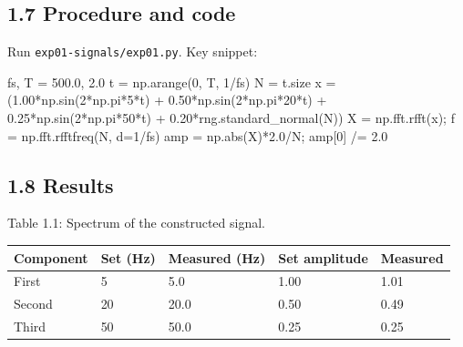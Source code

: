 \documentclass[
]{article}
\newenvironment{Shaded}{}{}
\newcommand{\BuiltInTok}[1]{\textcolor[rgb]{0.00,0.50,0.00}{#1}}
\newcommand{\DecValTok}[1]{\textcolor[rgb]{0.25,0.63,0.44}{#1}}
\newcommand{\FloatTok}[1]{\textcolor[rgb]{0.25,0.63,0.44}{#1}}
\newcommand{\NormalTok}[1]{#1}
\newcommand{\OperatorTok}[1]{\textcolor[rgb]{0.40,0.40,0.40}{#1}}
\newcounter{none} %
\begin{document}
\subsection{1.7 Procedure and code}\label{procedure-and-code}

Run \texttt{exp01-signals/exp01.py}. Key snippet:

\begin{Shaded}
\begin{Highlighting}[]
\NormalTok{fs, T }\OperatorTok{=} \FloatTok{500.0}\NormalTok{, }\FloatTok{2.0}
\NormalTok{t }\OperatorTok{=}\NormalTok{ np.arange(}\DecValTok{0}\NormalTok{, T, }\DecValTok{1}\OperatorTok{/}\NormalTok{fs)}
\NormalTok{N }\OperatorTok{=}\NormalTok{ t.size}
\NormalTok{x }\OperatorTok{=}\NormalTok{ (}\FloatTok{1.00}\OperatorTok{*}\NormalTok{np.sin(}\DecValTok{2}\OperatorTok{*}\NormalTok{np.pi}\OperatorTok{*}\DecValTok{5}\OperatorTok{*}\NormalTok{t) }\OperatorTok{+} \FloatTok{0.50}\OperatorTok{*}\NormalTok{np.sin(}\DecValTok{2}\OperatorTok{*}\NormalTok{np.pi}\OperatorTok{*}\DecValTok{20}\OperatorTok{*}\NormalTok{t)}
     \OperatorTok{+} \FloatTok{0.25}\OperatorTok{*}\NormalTok{np.sin(}\DecValTok{2}\OperatorTok{*}\NormalTok{np.pi}\OperatorTok{*}\DecValTok{50}\OperatorTok{*}\NormalTok{t) }\OperatorTok{+} \FloatTok{0.20}\OperatorTok{*}\NormalTok{rng.standard\_normal(N))}
\NormalTok{X }\OperatorTok{=}\NormalTok{ np.fft.rfft(x)}\OperatorTok{;}\NormalTok{ f }\OperatorTok{=}\NormalTok{ np.fft.rfftfreq(N, d}\OperatorTok{=}\DecValTok{1}\OperatorTok{/}\NormalTok{fs)}
\NormalTok{amp }\OperatorTok{=}\NormalTok{ np.}\BuiltInTok{abs}\NormalTok{(X)}\OperatorTok{*}\FloatTok{2.0}\OperatorTok{/}\NormalTok{N}\OperatorTok{;}\NormalTok{ amp[}\DecValTok{0}\NormalTok{] }\OperatorTok{/=} \FloatTok{2.0}
\end{Highlighting}
\end{Shaded}

\subsection{1.8 Results}\label{results}

Table 1.1: Spectrum of the constructed signal.

{\def\LTcaptype{none} %
\begin{longtable}[]{@{}lllll@{}}
\toprule\noalign{}
Component & Set (Hz) & Measured (Hz) & Set amplitude & Measured \\
\midrule\noalign{}
\endhead
\bottomrule\noalign{}
\endlastfoot
First & 5 & 5.0 & 1.00 & 1.01 \\
Second & 20 & 20.0 & 0.50 & 0.49 \\
Third & 50 & 50.0 & 0.25 & 0.25 \\
\end{longtable}
}
\end{document}
